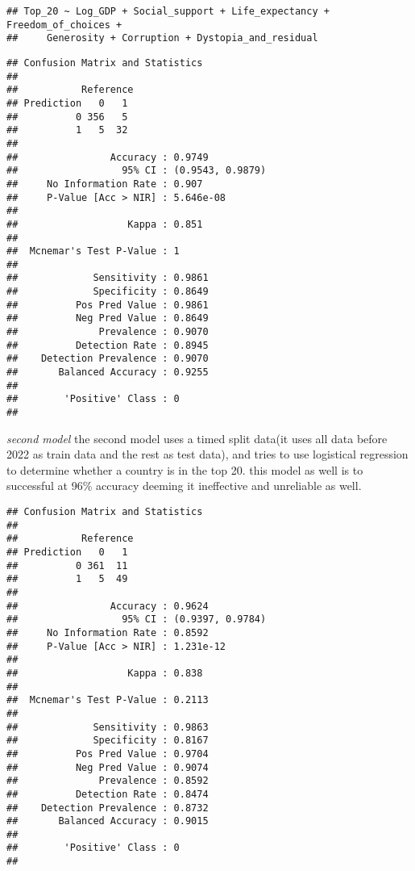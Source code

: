 \documentclass[
]{article}
\begin{document}
\begin{verbatim}
## Top_20 ~ Log_GDP + Social_support + Life_expectancy + Freedom_of_choices + 
##     Generosity + Corruption + Dystopia_and_residual
\end{verbatim}

\begin{verbatim}
## Confusion Matrix and Statistics
## 
##           Reference
## Prediction   0   1
##          0 356   5
##          1   5  32
##                                           
##                Accuracy : 0.9749          
##                  95% CI : (0.9543, 0.9879)
##     No Information Rate : 0.907           
##     P-Value [Acc > NIR] : 5.646e-08       
##                                           
##                   Kappa : 0.851           
##                                           
##  Mcnemar's Test P-Value : 1               
##                                           
##             Sensitivity : 0.9861          
##             Specificity : 0.8649          
##          Pos Pred Value : 0.9861          
##          Neg Pred Value : 0.8649          
##              Prevalence : 0.9070          
##          Detection Rate : 0.8945          
##    Detection Prevalence : 0.9070          
##       Balanced Accuracy : 0.9255          
##                                           
##        'Positive' Class : 0               
## 
\end{verbatim}

\emph{second model} the second model uses a timed split data(it uses all
data before 2022 as train data and the rest as test data), and tries to
use logistical regression to determine whether a country is in the top
20. this model as well is to successful at 96\% accuracy deeming it
ineffective and unreliable as well.

\begin{verbatim}
## Confusion Matrix and Statistics
## 
##           Reference
## Prediction   0   1
##          0 361  11
##          1   5  49
##                                           
##                Accuracy : 0.9624          
##                  95% CI : (0.9397, 0.9784)
##     No Information Rate : 0.8592          
##     P-Value [Acc > NIR] : 1.231e-12       
##                                           
##                   Kappa : 0.838           
##                                           
##  Mcnemar's Test P-Value : 0.2113          
##                                           
##             Sensitivity : 0.9863          
##             Specificity : 0.8167          
##          Pos Pred Value : 0.9704          
##          Neg Pred Value : 0.9074          
##              Prevalence : 0.8592          
##          Detection Rate : 0.8474          
##    Detection Prevalence : 0.8732          
##       Balanced Accuracy : 0.9015          
##                                           
##        'Positive' Class : 0               
## 
\end{verbatim}
\end{document}
